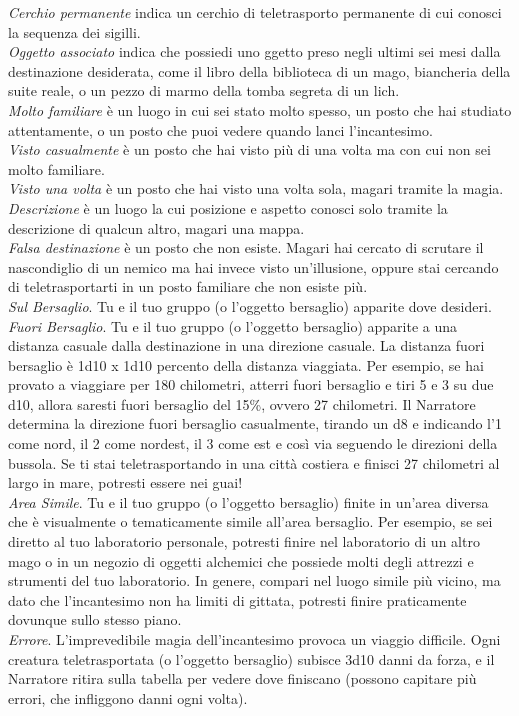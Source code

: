\begin{multicols}{2}

\textit{Cerchio permanente} indica un cerchio di teletrasporto permanente di cui conosci la sequenza dei sigilli.\\
\textit{Oggetto associato} indica che possiedi uno ggetto preso negli ultimi sei mesi dalla destinazione desiderata, come il libro della biblioteca di un mago, biancheria della suite reale, o un pezzo di marmo della tomba segreta di un lich.\\
\textit{Molto familiare} è un luogo in cui sei stato molto spesso, un posto che hai studiato attentamente, o un posto che puoi vedere quando lanci l'incantesimo.\\
\textit{Visto casualmente} è un posto che hai visto più di una volta ma con cui non sei molto familiare. \\
\textit{Visto una volta} è un posto che hai visto una volta sola, magari tramite la magia.\\ \textit{Descrizione} è un luogo la cui posizione e aspetto conosci solo tramite la descrizione di qualcun altro, magari una mappa.\\
\textit{Falsa destinazione} è un posto che non esiste. Magari hai cercato di scrutare il nascondiglio di un nemico ma hai invece visto un'illusione, oppure stai cercando di teletrasportarti in un posto familiare che non esiste più. \\
\textit{Sul Bersaglio}. Tu e il tuo gruppo (o l'oggetto bersaglio) apparite dove desideri.\\
\textit{Fuori Bersaglio}. Tu e il tuo gruppo (o l'oggetto bersaglio) apparite a una distanza casuale dalla destinazione in una direzione casuale. La distanza fuori bersaglio è 1d10 x 1d10 percento della distanza viaggiata. Per esempio, se hai provato a viaggiare per 180 chilometri, atterri fuori bersaglio e tiri 5 e 3 su due d10, allora saresti fuori bersaglio del 15\%, ovvero 27 chilometri. Il Narratore determina la direzione fuori bersaglio casualmente, tirando un d8 e indicando l'1 come nord, il 2 come nordest, il 3 come est e così via seguendo le direzioni della bussola. Se ti stai teletrasportando in una città costiera e finisci 27 chilometri al largo in mare, potresti essere nei guai!\\
\textit{Area Simile}. Tu e il tuo gruppo (o l'oggetto bersaglio) finite in un'area diversa che è visualmente o tematicamente simile all'area bersaglio. Per esempio, se sei diretto al tuo laboratorio personale, potresti finire nel laboratorio di un altro mago o in un negozio di oggetti alchemici che possiede molti degli attrezzi e strumenti del tuo laboratorio. In genere, compari nel luogo simile più vicino, ma dato che l'incantesimo non ha limiti di gittata, potresti finire praticamente dovunque sullo stesso piano.\\
\textit{Errore}. L'imprevedibile magia dell'incantesimo provoca un viaggio difficile. Ogni creatura teletrasportata (o l'oggetto bersaglio) subisce 3d10 danni da forza, e il Narratore ritira sulla tabella per vedere dove finiscano (possono capitare più errori, che infliggono danni ogni
volta).


\end{multicols}
